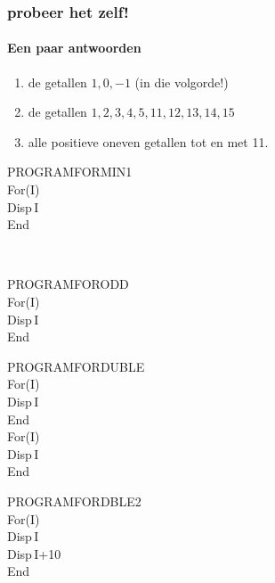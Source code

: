 \begin{frame}
\frametitle{ probeer het zelf!}
\framesubtitle{Een paar antwoorden}

\begin{enumerate}
  \item {} de getallen $1,0,-1$ (in die volgorde!)
  \item {} de getallen $1,2,3,4,5,11,12,13,14,15$
  \item {} alle positieve oneven getallen tot en met 11.
\end{enumerate}

\hspace{-0.7cm}
\begin{minipage}{0.25\textwidth}
\begin{ticalc}
	PROGRAM\:FORMIN1\\%
	\:For(I)\\%
	\:Disp\,I\\%
	\:End
\end{ticalc}\\
\begin{ticalc}
	PROGRAM\:FORODD\\%
	\:For(I)\\%
	\:Disp\,I\\%
	\:End
\end{ticalc}
\end{minipage}
\hspace{0.7cm}
\begin{minipage}{0.25\textwidth}
\begin{ticalc}
	PROGRAM\:FORDUBLE\\%
	\:For(I)\\%
	\:Disp\,I\\%
	\:End\\%
	\:For(I)\\%
	\:Disp\,I\\%
	\:End
\end{ticalc}
\end{minipage}
\hspace{0.7cm}
\begin{minipage}{0.33\textwidth}
\begin{ticalc}
	PROGRAM\:FORDBLE2\\%
	\:For(I)\\%
	\:Disp\,I\\%
	\:Disp\,I+10\\%
	\:End
\end{ticalc}
\end{minipage}


\end{frame}







